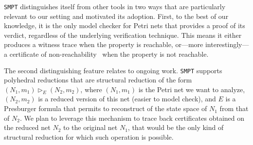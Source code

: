 \texttt{SMPT} distinguishes itself from other tools in two ways that are particularly relevant to our setting and motivated its adoption. First, to the best of our knowledge, it is the only model checker for Petri nets that provides a proof of its verdict, regardless of the underlying verification technique. This means it either produces a witness trace when the property is reachable, or—more interestingly—a certificate of non-reachability~\cite{AmDaHu22} when the property is not reachable.

The second distinguishing feature relates to ongoing work. \texttt{SMPT} supports polyhedral reductions\cite{AmBeDa21} that are structural reduction\cite{berthelot_transformations_1987,berthomieu_counting_2019} of the form $(N_1, m_1) \vartriangleright_E (N_2, m_2)$, where $(N_1, m_1)$ is the Petri net we want to analyze, $(N_2, m_2)$ is a reduced version of this net (easier to model check), and $E$ is a Presburger formula that permits to reconstruct of the state space of $N_1$ from that of $N_2$. We plan to leverage this mechanism to trace back certificates obtained on the reduced net $N_2$ to the original net $N_1$, that would be the only kind of structural reduction for which such operation is possible.

%
%


